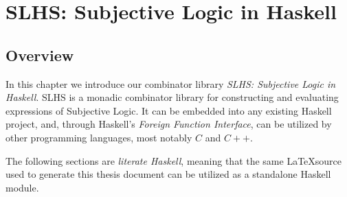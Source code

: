 \documentclass[thesis.tex]{subfiles}
\begin{document}
\chapter{SLHS: Subjective Logic in Haskell}

\section{Overview}

In this chapter we introduce our combinator library \emph{SLHS: Subjective Logic
in Haskell}. SLHS is a monadic combinator library for constructing and evaluating
expressions of Subjective Logic. It can be embedded into any existing Haskell
project, and, through Haskell's \emph{Foreign Function Interface}, can be utilized
by other programming languages, most notably $C$ and $C++$.

The following sections are \emph{literate Haskell}, meaning that the same
\LaTeX source used to generate this thesis document can be utilized as a standalone
Haskell module.








\end{document}
